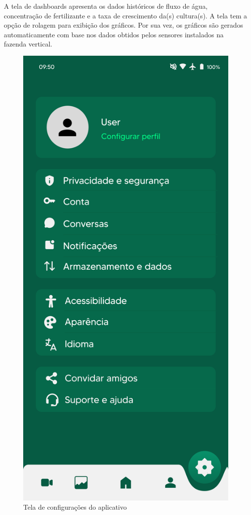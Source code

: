 A tela de dashboards apresenta os dados históricos de fluxo de água, concentração de fertilizante e a taxa de crescimento da(s) cultura(s). A tela tem a opção de rolagem para exibição dos gráficos. Por sua vez, os gráficos são gerados automaticamente com base nos dados obtidos pelos sensores instalados na fazenda vertical.
\clearpage
\begin{figure}[!h]
\centering
\caption{Tela de configurações do aplicativo}
\label{fig:picture6}
\includegraphics[scale=0.3]{Illustrations/Picture6.png}
\end{figure}


